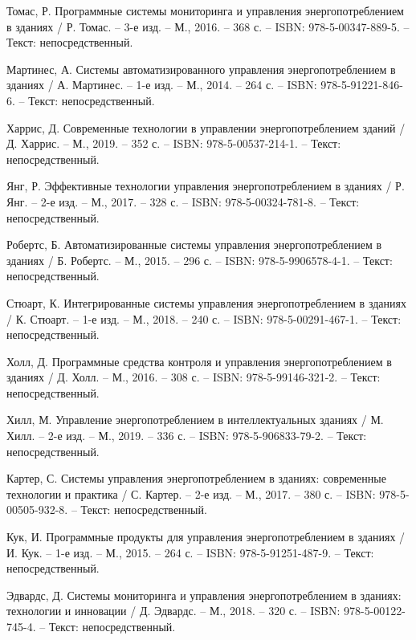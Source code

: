 \begin{thebibliography}{50}
	 Томас, Р. Программные системы мониторинга и управления энергопотреблением в зданиях / Р. Томас. – 3-е изд. – М., 2016. – 368 с. – ISBN: 978-5-00347-889-5. – Текст: непосредственный.
	
	 Мартинес, А. Системы автоматизированного управления энергопотреблением в зданиях / А. Мартинес. – 1-е изд. – М., 2014. – 264 с. – ISBN: 978-5-91221-846-6. – Текст: непосредственный.
	
	 Харрис, Д. Современные технологии в управлении энергопотреблением зданий / Д. Харрис. – М., 2019. – 352 с. – ISBN: 978-5-00537-214-1. – Текст: непосредственный.
	
	 Янг, Р. Эффективные технологии управления энергопотреблением в зданиях / Р. Янг. – 2-е изд. – М., 2017. – 328 с. – ISBN: 978-5-00324-781-8. – Текст: непосредственный.
	
	 Робертс, Б. Автоматизированные системы управления энергопотреблением в зданиях / Б. Робертс. – М., 2015. – 296 с. – ISBN: 978-5-9906578-4-1. – Текст: непосредственный.
	
	 Стюарт, К. Интегрированные системы управления энергопотреблением в зданиях / К. Стюарт. – 1-е изд. – М., 2018. – 240 с. – ISBN: 978-5-00291-467-1. – Текст: непосредственный.
	
	 Холл, Д. Программные средства контроля и управления энергопотреблением в зданиях / Д. Холл. – М., 2016. – 308 с. – ISBN: 978-5-99146-321-2. – Текст: непосредственный.
	
	 Хилл, М. Управление энергопотреблением в интеллектуальных зданиях / М. Хилл. – 2-е изд. – М., 2019. – 336 с. – ISBN: 978-5-906833-79-2. – Текст: непосредственный.
	
	 Картер, С. Системы управления энергопотреблением в зданиях: современные технологии и практика / С. Картер. – 2-е изд. – М., 2017. – 380 с. – ISBN: 978-5-00505-932-8. – Текст: непосредственный.
	
	 Кук, И. Программные продукты для управления энергопотреблением в зданиях / И. Кук. – 1-е изд. – М., 2015. – 264 с. – ISBN: 978-5-91251-487-9. – Текст: непосредственный.
	
	 Эдвардс, Д. Системы мониторинга и управления энергопотреблением в зданиях: технологии и инновации / Д. Эдвардс. – М., 2018. – 320 с. – ISBN: 978-5-00122-745-4. – Текст: непосредственный.
	

\end{thebibliography}
